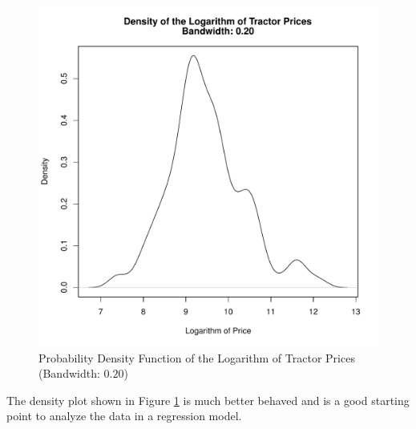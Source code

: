 \documentclass[11pt]{book}
\begin{document}
\begin{figure}[h!]
  \centering
  \includegraphics[scale = 0.5, keepaspectratio=true]{../Figures/density_log_saleprice_bw020}
  \caption{Probability Density Function of the Logarithm of Tractor Prices (Bandwidth: $0.20$)} \label{fig:density_log_saleprice_bw020}
\end{figure}


The density plot
shown in Figure \ref{fig:density_log_saleprice_bw020}
is much better behaved and is a good starting point to
analyze the data in a regression model.



\end{document}
